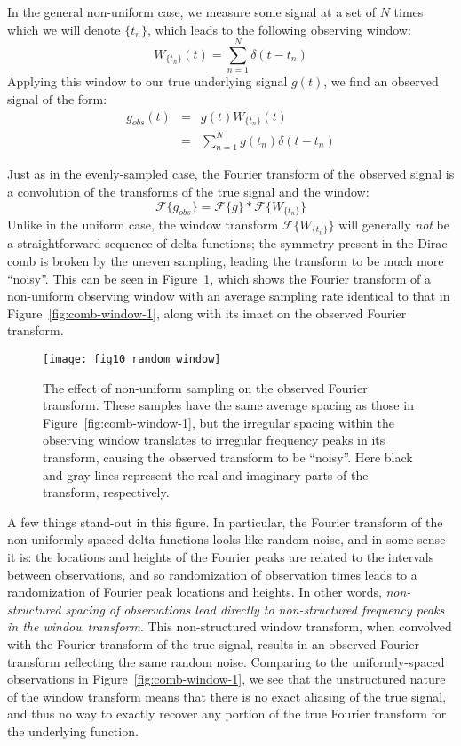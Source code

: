 \documentclass[preprint]{aastex}
\newcommand{\fig}[1]{Figure~\ref{fig:#1}}
\newcommand{\figlabel}[1]{\label{fig:#1}}
\newcommand{\eqlabel}[1]{\label{eq:#1}}
\begin{document}
In the general non-uniform case, we measure some signal at a set of $N$ times
which we will denote $\{t_n\}$, which leads to the following observing window:
\begin{equation}
  W_{\{t_n\}}(t) = \sum_{n=1}^{N} \delta(t - t_n)
  \eqlabel{nonuniform-window}
\end{equation}
Applying this window to our true underlying signal $g(t)$, we find an observed
signal of the form:
\begin{eqnarray}
  g_{obs}(t) &=& g(t) W_{\{t_n\}}(t) \nonumber\\
             &=& \sum_{n=1}^{N} g(t_n)\delta(t - t_n)
  \eqlabel{g-nonuniform}
\end{eqnarray}

Just as in the evenly-sampled case, the Fourier transform of the observed
signal is a convolution of the transforms of the true signal and the window:
\begin{equation}
  \mathcal{F}\{g_{obs}\} = \mathcal{F}\{g\} \ast \mathcal{F}\{W_{\{t_n\}}\}
  \eqlabel{g-obs-conv}
\end{equation}
Unlike in the uniform case, the window transform $\mathcal{F}\{W_{\{t_n\}}\}$
will generally {\it not} be a straightforward sequence of delta functions; the
symmetry present in the Dirac comb is broken by the uneven sampling,
leading the transform to be much more ``noisy''.
This can be seen in \fig{random-window}, which shows the Fourier transform of
a non-uniform observing window with an average sampling rate identical to
that in \fig{comb-window-1}, along with its imact on the observed Fourier
transform.

\begin{figure}[ht]
  \centering
  \texttt{[image: fig10\_random\_window]}
  \caption{The effect of non-uniform sampling on the observed Fourier transform.
    These samples have the same average spacing as those in \fig{comb-window-1},
    but the irregular spacing within the observing window translates to
    irregular frequency peaks in its transform,
    causing the observed transform to be ``noisy''.
    Here black and gray lines represent the real and imaginary parts of the
    transform, respectively.
    \figlabel{random-window}}
\end{figure}

A few things stand-out in this figure. In particular, the Fourier transform of
the non-uniformly spaced delta functions looks like random noise, and in some
sense it is: the locations and heights of the Fourier peaks are related to
the intervals between observations, and so randomization of observation times
leads to a randomization of Fourier peak locations and heights.
In other words, {\it non-structured spacing of observations lead directly to
non-structured frequency peaks in the window transform}.
This non-structured window transform, when convolved with the Fourier transform
of the true signal, results in an observed Fourier transform reflecting the
same random noise.
Comparing to the uniformly-spaced observations in \fig{comb-window-1}, we
see that the unstructured nature of the window transform means that there
is no exact aliasing of the true signal, and thus no way to exactly recover
any portion of the true Fourier transform for the underlying function.
\end{document}
